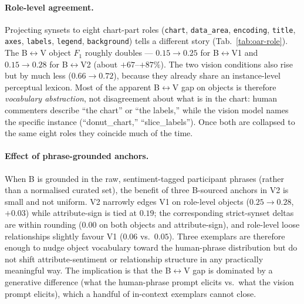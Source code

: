 \paragraph{Role-level agreement.}
Projecting synsets to eight chart-part roles
(\texttt{chart}, \texttt{data\_area}, \texttt{encoding},
\texttt{title}, \texttt{axes}, \texttt{labels}, \texttt{legend},
\texttt{background}) tells a different story
(Tab.~\ref{tab:oar-role}). The B$\leftrightarrow$V object $F_1$
roughly doubles --- $0.15 \to 0.25$ for B$\leftrightarrow$V1 and
$0.15 \to 0.28$ for B$\leftrightarrow$V2 (about $+67$--$+87\%$). The
two vision conditions also rise but by much less ($0.66 \to 0.72$),
because they already share an instance-level perceptual lexicon.
Most of the apparent B$\leftrightarrow$V gap on objects is
therefore \emph{vocabulary abstraction}, not disagreement about
what is in the chart: human commenters describe ``the chart'' or
``the labels,'' while the vision model names the specific instance
(``donut\_chart,'' ``slice\_labels''). Once both are collapsed to
the same eight roles they coincide much of the time.

\paragraph{Effect of phrase-grounded anchors.}
When B is grounded in the raw, sentiment-tagged participant phrases
(rather than a normalised curated set), the benefit of three
B-sourced anchors in V2 is small and not uniform. V2 narrowly edges
V1 on role-level objects ($0.25 \to 0.28$, $+0.03$) while
attribute-sign is tied at $0.19$; the corresponding
strict-synset deltas are within rounding ($0.00$ on both objects
and attribute-sign), and role-level loose relationships slightly
favour V1 ($0.06$ vs.\ $0.05$). Three exemplars are therefore
enough to nudge object vocabulary toward the human-phrase
distribution but do not shift attribute-sentiment or relationship
structure in any practically meaningful way. The implication is
that the B$\leftrightarrow$V gap is dominated by a generative
difference (what the human-phrase prompt elicits vs.\ what the
vision prompt elicits), which a handful of in-context exemplars
cannot close.

